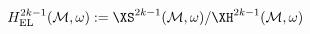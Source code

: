\begin{equation}
  H^{2k-1}_{\mathrm{EL}}(\mathcal{M},\omega)
  :=
  \XS^{2k-1}(\mathcal{M},\omega)/\XH^{2k-1}(\mathcal{M},\omega)
\label{eq:HELdef}
\end{equation}

